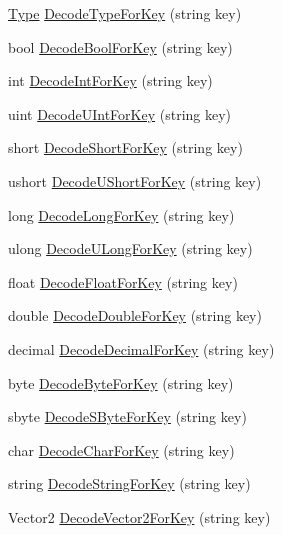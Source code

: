 \begin{DoxyCompactItemize}
\hyperlink{i_c_s___object_type_enum_8cs_ae6c3dd6d8597380b56d94908eb431547aa1fa27779242b4902f7ae3bdd5c6d508}{Type} \hyperlink{classi_c_s___coder_a51cf0e957f221ec4992b9809e2b2bbc4}{Decode\+Type\+For\+Key} (string key)
\item 
bool \hyperlink{classi_c_s___coder_a6de572dd8c7e470b0e73894d38761943}{Decode\+Bool\+For\+Key} (string key)
\item 
int \hyperlink{classi_c_s___coder_afe0788bb79c399d5df7fe824b67b5e37}{Decode\+Int\+For\+Key} (string key)
\item 
uint \hyperlink{classi_c_s___coder_a7f9b4a997826cfd143835da888fb3eb7}{Decode\+U\+Int\+For\+Key} (string key)
\item 
short \hyperlink{classi_c_s___coder_ab77342afa0736ed9b753b996f0932d50}{Decode\+Short\+For\+Key} (string key)
\item 
ushort \hyperlink{classi_c_s___coder_a2ef878511faca4d358c9d457513e4193}{Decode\+U\+Short\+For\+Key} (string key)
\item 
long \hyperlink{classi_c_s___coder_a6c7c9e1d0fea6dd1016cbc6e93f3fab4}{Decode\+Long\+For\+Key} (string key)
\item 
ulong \hyperlink{classi_c_s___coder_a7537699f1039de4a706b53e5ae1f2f7b}{Decode\+U\+Long\+For\+Key} (string key)
\item 
float \hyperlink{classi_c_s___coder_aabf6fdb195b8797de86b04f77522a834}{Decode\+Float\+For\+Key} (string key)
\item 
double \hyperlink{classi_c_s___coder_a189d6348410edecbcf32a451cd3a2889}{Decode\+Double\+For\+Key} (string key)
\item 
decimal \hyperlink{classi_c_s___coder_a344eec73405d7e3d46ba87f838fd2818}{Decode\+Decimal\+For\+Key} (string key)
\item 
byte \hyperlink{classi_c_s___coder_ae93595086095695f34e9f4642e35f95d}{Decode\+Byte\+For\+Key} (string key)
\item 
sbyte \hyperlink{classi_c_s___coder_ae933fe8f2feb36f12015d952402a6c2a}{Decode\+S\+Byte\+For\+Key} (string key)
\item 
char \hyperlink{classi_c_s___coder_a1b5eb18ce48f3cdb0c234ffb9c05d60d}{Decode\+Char\+For\+Key} (string key)
\item 
string \hyperlink{classi_c_s___coder_a593420aff32dfa9be4f6727e91acd5c2}{Decode\+String\+For\+Key} (string key)
\item 
Vector2 \hyperlink{classi_c_s___coder_a8d0e141da2ff2b2ae078bb1668153133}{Decode\+Vector2\+For\+Key} (string key)
\item 

\end{DoxyCompactItemize}
